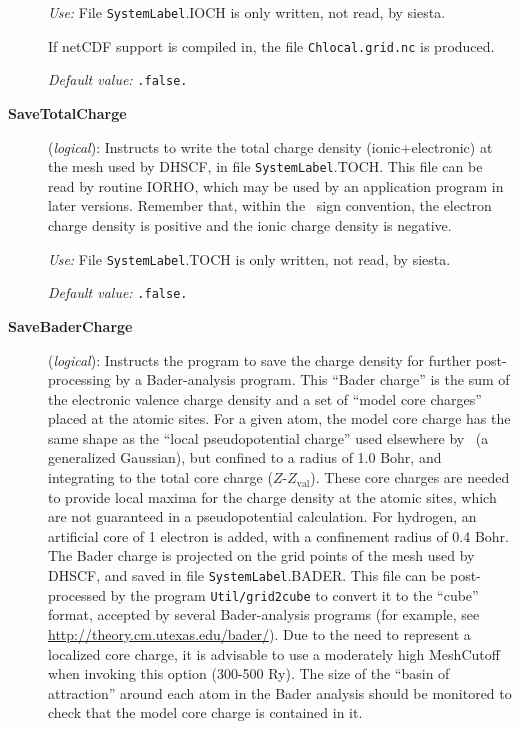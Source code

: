 \begin{description}
\textit{Use:} File \texttt{SystemLabel}.IOCH is only written, not read, by siesta.

If netCDF support is compiled in, the file \texttt{Chlocal.grid.nc} is produced.

\textit{Default value:} \texttt{.false.}

\item[\textbf{SaveTotalCharge}] (\textit{logical}):
Instructs to write the total charge density (ionic+electronic) at the
mesh used by DHSCF,
in file \texttt{SystemLabel}.TOCH. This file can be read by routine IORHO,
which may be used by an application program in later versions.
Remember that, within the \siesta\ sign convention, the electron charge
density is positive and the ionic charge density is negative.

\textit{Use:} File \texttt{SystemLabel}.TOCH is only written, not read, by siesta.

\textit{Default value:} \texttt{.false.}

\item[\textbf{SaveBaderCharge}] (\textit{logical}):
  Instructs the program to save the charge density for
further post-processing by a Bader-analysis program.  This ``Bader
charge'' is the sum of the electronic valence charge density and a set
of ``model core charges'' placed at the atomic sites. For a given
atom, the model core charge has the same shape as the ``local
pseudopotential charge'' used elsewhere by \siesta\ (a generalized
Gaussian), but confined to a radius of 1.0 Bohr, and integrating to
the total core charge ($Z$-$Z_{\mathrm{val}}$). These core charges are
needed to provide local maxima for the charge density at the atomic
sites, which are not guaranteed in a pseudopotential calculation. For
hydrogen, an artificial core of 1 electron is added, with a
confinement radius of 0.4 Bohr.  The Bader charge is projected on the
grid points of the mesh used by DHSCF, and saved in file
\texttt{SystemLabel}.BADER. This file can be post-processed by the
program \texttt{Util/grid2cube} to convert it to the ``cube'' format,
accepted by several Bader-analysis programs (for example, see
\url{http://theory.cm.utexas.edu/bader/}).  Due to the need to
represent a localized core charge, it is advisable to use a moderately
high MeshCutoff when invoking this option (300-500 Ry). The size of
the ``basin of attraction'' around each atom in the Bader analysis
should be monitored to check that the model core charge is contained
in it.


\end{description}
